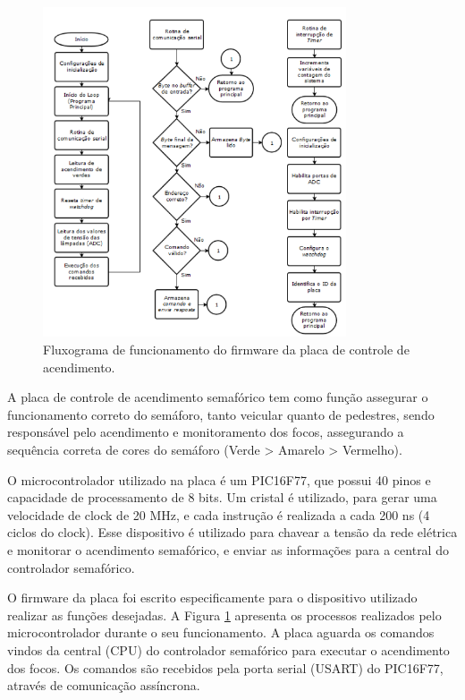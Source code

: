\begin{figure}[ht]
    \begin{center}
    \includegraphics[width=0.8\textwidth]{figuras/fluxo_fase.PNG}
    \end{center}
    \caption[Placa de fase]{Fluxograma de funcionamento do firmware da placa de controle de acendimento.}
    \label{placa_fase}
\end{figure}

A placa de controle de acendimento semafórico tem como função assegurar o funcionamento correto do semáforo, tanto veicular quanto de pedestres, sendo responsável pelo acendimento e monitoramento dos focos, assegurando a sequência correta de cores do semáforo (Verde > Amarelo > Vermelho).

O microcontrolador utilizado na placa é um PIC16F77, que possui 40 pinos e capacidade de processamento de 8 bits. Um cristal é utilizado, para gerar uma velocidade de clock de 20 MHz, e cada instrução é realizada a cada 200 ns (4 ciclos do clock). Esse dispositivo é utilizado para chavear a tensão da rede elétrica e monitorar o acendimento semafórico, e enviar as informações para a central do controlador semafórico.

O firmware da placa foi escrito especificamente para o dispositivo utilizado realizar as funções desejadas. A Figura \ref{placa_fase} apresenta os processos realizados pelo microcontrolador durante o seu funcionamento. A placa aguarda os comandos vindos da central (CPU) do controlador semafórico para executar o acendimento dos focos. Os comandos são recebidos pela porta serial (USART) do PIC16F77, através de comunicação assíncrona.

